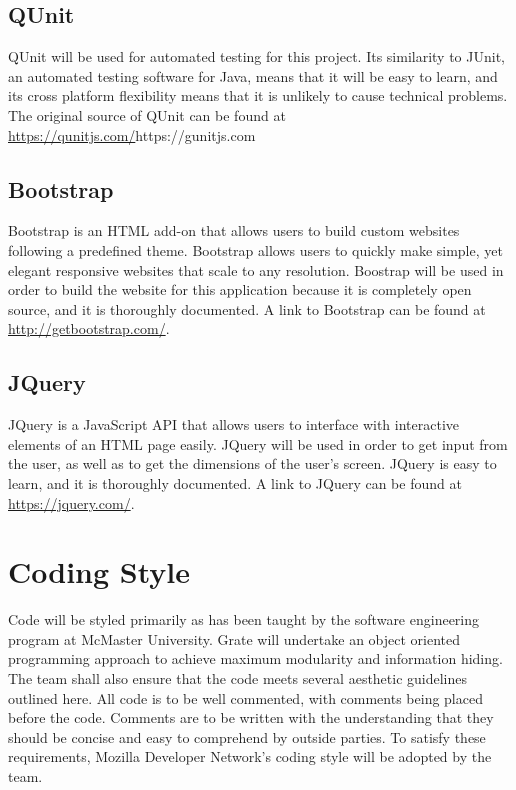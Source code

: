 \documentclass{article}
\begin{document}
\subsection{QUnit}
QUnit will be used for automated testing for this project. Its similarity to 
JUnit, an automated testing software for Java, means that it will be easy to 
learn, and its cross platform flexibility means that it is unlikely to cause 
technical problems. The original source of QUnit can be found at
\url{https://qunitjs.com/}{https://gunitjs.com}

\subsection{Bootstrap}
\textcolor{RoyalPurple}{
Bootstrap is an HTML add-on that allows users to build custom websites following a predefined theme. Bootstrap allows users to quickly make simple, yet elegant responsive websites that scale to any resolution. Boostrap will be used in order to build the website for this application because it is completely open source, and it is thoroughly documented. A link to Bootstrap can be found at \url{http://getbootstrap.com/}.}

\subsection{JQuery}
\textcolor{RoyalPurple}{
JQuery is a JavaScript API that allows users to interface with interactive elements of an HTML page easily. JQuery will be used in order to get input from the user, as well as to get the dimensions of the user's screen. JQuery is easy to learn, and it is thoroughly documented. A link to JQuery can be found at \url{https://jquery.com/}.}

\section{Coding Style}

Code will be styled primarily as has been taught by the software engineering 
program at McMaster University. \textcolor{RoyalPurple}{Grate} will undertake an object oriented 
programming approach to achieve maximum modularity and information hiding. The 
team shall also ensure that the code meets several aesthetic guidelines outlined 
here. All code is to be well commented, with comments being placed before the 
code. Comments are to be written with the understanding that they should be 
concise and easy to comprehend by outside parties. To \textcolor{RoyalPurple}{satisfy} these 
requirements, Mozilla Developer Network's coding style will be adopted by the 
team. 
\end{document}
